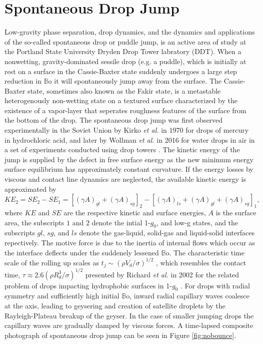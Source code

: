 \documentclass[12pt,a4paper,oneside]{book}
\begin{document}
\section{Spontaneous Drop Jump}
Low-gravity phase separation, drop dynamics, and the dynamics and applications of the so-called spontaneous drop or puddle jump, is an active area of study at the Portland State University Dryden Drop Tower labratory (DDT). When a nonwetting, gravity-dominated sessile drop (e.g. a puddle), which is initially at rest on a surface in the Cassie-Baxter state suddenly undergoes a large step reduction in $\mathbb{B}\mbox{o}$ it will spontaneously jump away from the surface. The Cassie-Baxter state, sometimes also known as the Fakir state, is a metastable heterogenously non-wetting state on a textured surface characterized by the existence of a vapor-layer that seperates roughness features of the surface from the bottom of the drop. The spontaneous drop jump was first observed experimentally in the Soviet Union by Kirko \emph{et al.} \cite{kirko_phenomenon_1970} in 1970 for drops of mercury in hydrochloric acid, and later by Wollman \emph{et al.} in 2016 for water drops in air in a set of experiments conducted using drop towers \cite{wollman_more_2016}. The kinetic energy of the jump is supplied by the defect in free surface energy as the new minimum energy surface equilibrium has approximately constant curvature. If the energy losses by viscous and contact line dynamics are neglected, the available kinetic energy is approximated by
\[KE_2 = SE_2 - SE_1 = [(\gamma A)_{gl} + (\gamma A)_{sg}]_2 - [(\gamma A)_{ls} + (\gamma A)_{gl} + (\gamma A)_{sg}]_1, \]
where $KE$ and $SE$ are the respective kinetic and surface energies, $A$ is the surface area, the subscripts $1$ and $2$ denote the intial 1-$g_0$, and low-g states, and the subscripts ${gl}$, ${sg}$, and ${ls}$ denote the gas-liquid, solid-gas and liquid-solid interfaces repectively. The motive force is due to the inertia of internal flows which occur as the interface deflects under the suddenely lessened $\mathbb{B}\mbox{o}$. The characteristic time scale of the rolling up scales as $t_j \sim (\rho V_d/\sigma)^{1/2}$ \cite{attari_puddle_2016}, which resembles the contact time, $\tau \approx 2.6(\rho R^3_d/\sigma)^{1/2}$ presented by Richard \emph{et al.} in 2002 for the related problem of drops impacting hydrophobic surfaces in 1-$g_0$ \cite{richard_surface_2002}. For drops with radial symmetry and sufficiently high initial $\mathbb{B}\mbox{o}$, inward radial capillary waves coalesce at the axis, leading to geysering and creation of satellite droplets by the Rayleigh-Plateau breakup of the geyser. In the case of smaller jumping drops the capillary waves are gradually damped by viscous forces. A time-lapsed composite photograph of spontaneous drop jump can be seen in Figure \ref{fig:nobounce}.
\end{document}
